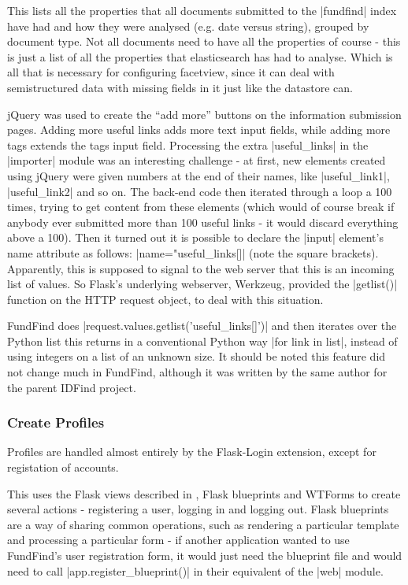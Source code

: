 This lists all the properties that all documents submitted to the |fundfind| index have had and how they were analysed (e.g. date versus string), grouped by document type. Not all documents need to have all the properties of course - this is just a list of all the properties that elasticsearch has had to analyse. Which is all that is necessary for configuring facetview, since it can deal with semistructured data with missing fields in it just like the datastore can.

jQuery was used to create the ``add more'' buttons on the information submission pages. Adding more useful links adds more text input fields, while adding more tags extends the tags input field. Processing the extra |useful_links| in the |importer| module was an interesting challenge - at first, new elements created using jQuery were given numbers at the end of their names, like |useful_link1|, |useful_link2| and so on. The back-end code then iterated through a loop a 100 times, trying to get content from these elements (which would of course break if anybody ever submitted more than 100 useful links - it would discard everything above a 100). Then it turned out it is possible to declare the |input| element's name attribute as follows: |name="useful_links[]| (note the square brackets). Apparently, this is supposed to signal to the web server that this is an incoming list of values. So Flask's underlying webserver, Werkzeug, provided the |getlist()| function on the HTTP request object, to deal with this situation.

FundFind does |request.values.getlist('useful_links[]')| and then iterates over the Python list this returns in a conventional Python way |for link in list|, instead of using integers on a list of an unknown size. It should be noted this feature did not change much in FundFind, although it was written by the same author for the parent IDFind project.

\subsubsection{Create Profiles}
\label{impl-profiles}
Profiles are handled almost entirely by the Flask-Login extension, except for registation of accounts. \cite{flask-login}

This uses the Flask views described in , Flask blueprints and WTForms to create several actions - registering a user, logging in and logging out. Flask blueprints are a way of sharing common operations, such as rendering a particular template and processing a particular form - if another application wanted to use FundFind's user registration form, it would just need the blueprint file and would need to call |app.register_blueprint()| in their equivalent of the |web| module.

